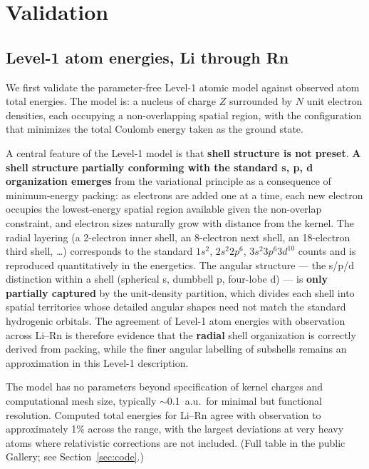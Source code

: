 \documentclass[11pt]{article}
\begin{document}
\section{Validation}\label{sec:validation}

\subsection{Level-1 atom energies, Li through Rn}\label{sec:atoms}

We first validate the parameter-free Level-1 atomic model against observed atom total energies. The model is: a nucleus of charge $Z$ surrounded by $N$ unit electron densities, each occupying a non-overlapping spatial region, with the configuration that minimizes the total Coulomb energy taken as the ground state.

A central feature of the Level-1 model is that \textbf{shell structure is not preset}. \textbf{A shell structure partially conforming with the standard s, p, d organization emerges} from the variational principle as a consequence of minimum-energy packing: as electrons are added one at a time, each new electron occupies the lowest-energy spatial region available given the non-overlap constraint, and electron sizes naturally grow with distance from the kernel. The radial layering (a 2-electron inner shell, an 8-electron next shell, an 18-electron third shell, \ldots) corresponds to the standard $1s^2$, $2s^2 2p^6$, $3s^2 3p^6 3d^{10}$ counts and is reproduced quantitatively in the energetics. The angular structure --- the s/p/d distinction within a shell (spherical s, dumbbell p, four-lobe d) --- is \textbf{only partially captured} by the unit-density partition, which divides each shell into spatial territories whose detailed angular shapes need not match the standard hydrogenic orbitals. The agreement of Level-1 atom energies with observation across Li--Rn is therefore evidence that the \textbf{radial} shell organization is correctly derived from packing, while the finer angular labelling of subshells remains an approximation in this Level-1 description.

The model has no parameters beyond specification of kernel charges and computational mesh size, typically $\sim$0.1~a.u.\ for minimal but functional resolution. Computed total energies for Li--Rn agree with observation to approximately 1\% across the range, with the largest deviations at very heavy atoms where relativistic corrections are not included. (Full table in the public Gallery; see Section~\ref{sec:code}.)
\end{document}
